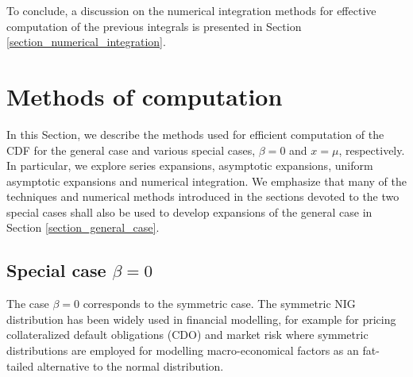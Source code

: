 \documentclass[10pt,a4paper,oneside]{article}
\numberwithin{equation}{section}
\begin{document}
To conclude, a discussion on the numerical integration methods for effective computation of the previous integrals is presented in Section \ref{section_numerical_integration}.

%
%

\section{Methods of computation}\label{section_methods_of_computation}
In this Section, we describe the methods used for efficient computation of the CDF for the general case and various special cases, $\beta = 0$ and $x=\mu$, respectively. In particular, we explore series expansions, asymptotic expansions, uniform asymptotic expansions and numerical integration. We emphasize that many of the techniques and numerical methods introduced in the sections devoted to the two special cases shall also be used to develop expansions of the general case in Section \ref{section_general_case}.


\subsection{Special case $\beta = 0$}\label{section_special_case_beta_0}
The case $\beta = 0$ corresponds to the symmetric case. The symmetric NIG distribution has been widely used in financial modelling, for example for pricing collateralized default obligations (CDO) \cite{Kalemanova2007} and market risk \cite{Prause1999} where symmetric distributions are employed for modelling macro-economical factors as an fat-tailed alternative to the normal distribution.
\end{document}
